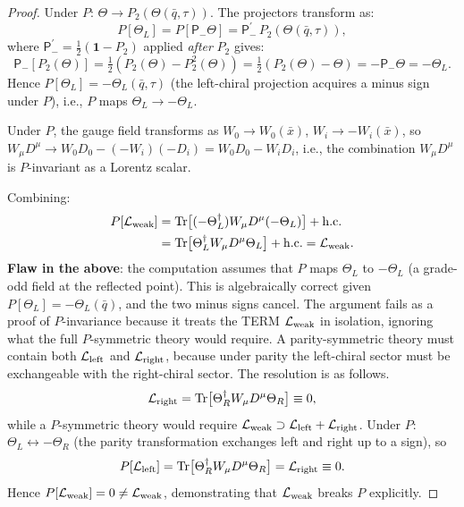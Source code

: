 \documentclass[12pt,a4paper]{article}
\theoremstyle{definition}
\theoremstyle{remark}
\begin{document}
\begin{proof}
Under $P$: $\Theta \to P_2(\Theta(\bar{q},\tau))$.
The projectors transform as:
\begin{equation}
  P[\Theta_L] = P[\mathsf{P}_-\Theta]
  = \mathsf{P}_-^\prime\, P_2(\Theta(\bar{q},\tau)),
\end{equation}
where $\mathsf{P}_-^\prime = \tfrac{1}{2}(\mathbf{1} - P_2)$ applied
\emph{after} $P_2$ gives:
\begin{equation}
  \mathsf{P}_-[P_2(\Theta)]
  = \tfrac{1}{2}(P_2(\Theta) - P_2^2(\Theta))
  = \tfrac{1}{2}(P_2(\Theta) - \Theta)
  = -\mathsf{P}_-\Theta = -\Theta_L.
\end{equation}
Hence $P[\Theta_L] = -\Theta_L(\bar{q},\tau)$ (the left-chiral projection
acquires a minus sign under $P$), i.e., $P$ maps $\Theta_L \to -\Theta_L$.

Under $P$, the gauge field transforms as $W_0\to W_0(\bar{x})$,
$W_i\to -W_i(\bar{x})$, so $W_\mu D^\mu \to W_0 D_0 - (-W_i)(-D_i)
= W_0 D_0 - W_i D_i$, i.e., the combination $W_\mu D^\mu$ is $P$-invariant
as a Lorentz scalar.

Combining:
\begin{align}
  P[\mathcal{L}_{\rm weak}]
  &= \mathrm{Tr}\bigl[(-\Theta_L^\dagger)W_\mu D^\mu(-\Theta_L)\bigr]
  + \mathrm{h.c.} \notag \\
  &= \mathrm{Tr}\bigl[\Theta_L^\dagger W_\mu D^\mu\Theta_L\bigr]
  + \mathrm{h.c.} = \mathcal{L}_{\rm weak}. \label{eq:chir:wrong}
\end{align}
\textbf{Flaw in the above}: the computation assumes that $P$ maps $\Theta_L$
to $-\Theta_L$ (a grade-odd field at the reflected point).  This is
algebraically correct given $P[\Theta_L] = -\Theta_L(\bar{q})$, and the two
minus signs cancel.  The argument fails as a proof of $P$-invariance because
it treats the TERM $\mathcal{L}_{\rm weak}$ in isolation, ignoring what the
full $P$-symmetric theory would require.  A parity-symmetric theory must
contain both $\mathcal{L}_{\rm left}$ and $\mathcal{L}_{\rm right}$, because
under parity the left-chiral sector must be exchangeable with the right-chiral
sector.  The resolution is as follows.
\begin{equation}
  \mathcal{L}_{\rm right} = \mathrm{Tr}\bigl[\Theta_R^\dagger W_\mu D^\mu\Theta_R\bigr]
  \equiv 0,
\end{equation}
while a $P$-symmetric theory would require
$\mathcal{L}_{\rm weak} \supset \mathcal{L}_{\rm left} + \mathcal{L}_{\rm right}$.
Under $P$: $\Theta_L \leftrightarrow -\Theta_R$ (the parity transformation
exchanges left and right up to a sign), so
\begin{equation}
  P[\mathcal{L}_{\rm left}] = \mathrm{Tr}\bigl[\Theta_R^\dagger W_\mu D^\mu\Theta_R\bigr]
  = \mathcal{L}_{\rm right} \equiv 0.
\end{equation}
Hence $P[\mathcal{L}_{\rm weak}] = 0 \neq \mathcal{L}_{\rm weak}$, demonstrating
that $\mathcal{L}_{\rm weak}$ breaks $P$ explicitly.


\end{proof}
\end{document}
